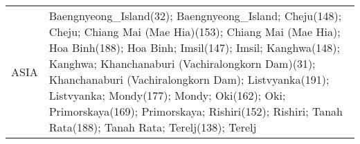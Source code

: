 \documentclass[journal abbreviation, manuscript]{copernicus}
\begin{document}
\begin{table}
\begin{tabularx}{\textwidth}{lX}
  ASIA     & Baengnyeong\_Island(32); Baengnyeong\_Island; Cheju(148); Cheju; Chiang Mai (Mae Hia)(153); Chiang Mai (Mae Hia); Hoa Binh(188); Hoa Binh; Imsil(147); Imsil; Kanghwa(148); Kanghwa; Khanchanaburi (Vachiralongkorn Dam)(31); Khanchanaburi (Vachiralongkorn Dam); Listvyanka(191); Listvyanka; Mondy(177); Mondy; Oki(162); Oki; Primorskaya(169); Primorskaya; Rishiri(152); Rishiri; Tanah Rata(188); Tanah Rata; Terelj(138); Terelj                                                                                                                                                                                                                                                                                                                                                                                                                                                                                                                                                                                                                                                                                                                                                                                                                                                                                                                                                                                                                                                                                                                                                                                                                                                                                                                                                                                                                                                                                                                                                                                                                                                                                                                                                                                                                                                                                                                                                                                                                                                                                                                                                                                                                                                                                                                                                                                                                                                                                                                                                                                                                                                                                                                                                                                                                                                                                                                                                                    
\end{tabularx}
\end{table}
\end{document}
